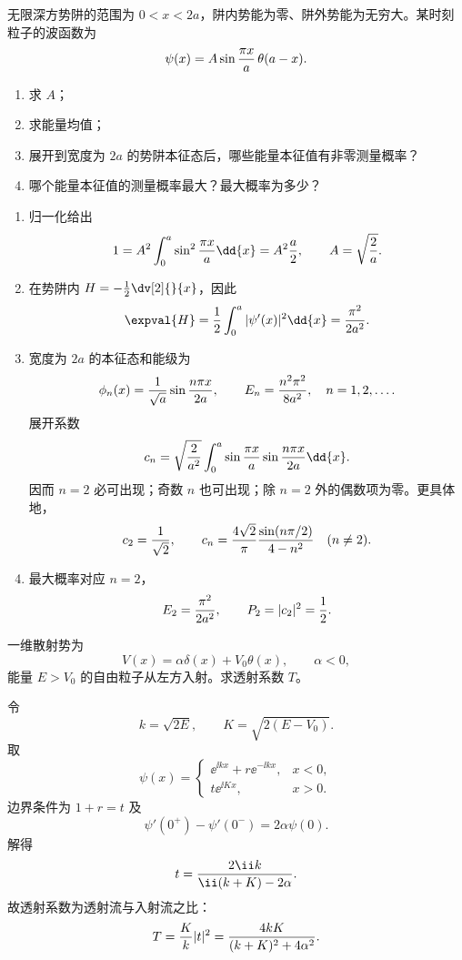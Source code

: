 \begin{question}
无限深方势阱的范围为 $0<x<2a$，阱内势能为零、阱外势能为无穷大。某时刻粒子的波函数为
\[
  \psi(x)=A\sin {\pi x\over a}\,\theta(a-x).
\]
\begin{enumerate}
  \item 求 $A$；
  \item 求能量均值；
  \item 展开到宽度为 $2a$ 的势阱本征态后，哪些能量本征值有非零测量概率？
  \item 哪个能量本征值的测量概率最大？最大概率为多少？
\end{enumerate}
\begin{solution}
\begin{enumerate}
  \item 归一化给出
  \[
    1=A^2\int_0^a\sin^2{\pi x\over a}\dd{x}=A^2{a\over 2},
    \qquad A=\sqrt{2\over a}.
  \]
  \item 在势阱内 $H=-\frac12\dv[2]{}{x}$，因此
  \[
    \expval{H}= {1\over 2}\int_0^a |\psi'(x)|^2\dd{x}
    ={\pi^2\over 2a^2}.
  \]
  \item 宽度为 $2a$ 的本征态和能级为
  \[
    \phi_n(x)={1\over \sqrt a}\sin {n\pi x\over 2a},
    \qquad E_n={n^2\pi^2\over 8a^2},\quad n=1,2,\ldots .
  \]
  展开系数
  \[
    c_n=\sqrt{2\over a^2}\int_0^a\sin {\pi x\over a}\sin {n\pi x\over 2a}\dd{x}.
  \]
  因而 $n=2$ 必可出现；奇数 $n$ 也可出现；除 $n=2$ 外的偶数项为零。更具体地，
  \[
    c_2={1\over\sqrt2},\qquad
    c_n={4\sqrt2\over \pi}{\sin(n\pi/2)\over 4-n^2}\quad(n\ne 2).
  \]
  \item 最大概率对应 $n=2$，
  \[
    E_2={\pi^2\over 2a^2},\qquad P_2=|c_2|^2={1\over 2}.
  \]
\end{enumerate}
\end{solution}
\end{question}

\begin{question}
一维散射势为
\[
  V(x)=\alpha\delta(x)+V_0\theta(x),\qquad \alpha<0,
\]
能量 $E>V_0$ 的自由粒子从左方入射。求透射系数 $T$。
\begin{solution}
令
\[
  k=\sqrt{2E},\qquad K=\sqrt{2(E-V_0)} .
\]
取
\[
  \psi(x)=\begin{cases}
  \ee^{\ii kx}+r\ee^{-\ii kx},&x<0,\\
  t\ee^{\ii Kx},&x>0.
  \end{cases}
\]
边界条件为 $1+r=t$ 及
\[
  \psi'(0^+)-\psi'(0^-)=2\alpha\psi(0).
\]
解得
\[
  t={2\ii k\over \ii(k+K)-2\alpha}.
\]
故透射系数为透射流与入射流之比：
\[
  T={K\over k}|t|^2={4kK\over (k+K)^2+4\alpha^2}.
\]
\end{solution}
\end{question}

